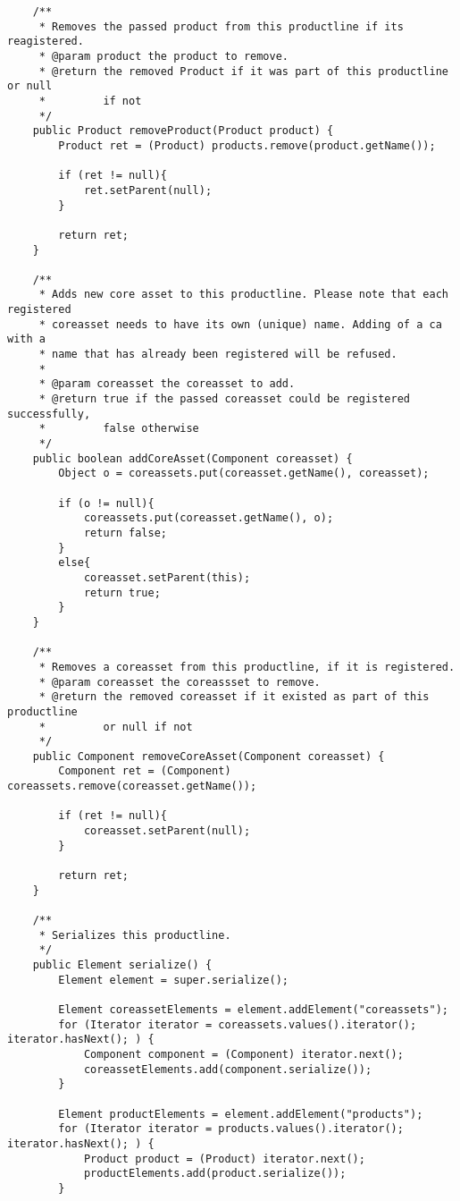 \begin{verbatim}
	/**
	 * Removes the passed product from this productline if its reagistered.
	 * @param product the product to remove.
     * @return the removed Product if it was part of this productline or null 
     *         if not
	 */
	public Product removeProduct(Product product) {
		Product ret = (Product) products.remove(product.getName());
        
        if (ret != null){
        	ret.setParent(null);
        }
        
        return ret;
	}

	/**
	 * Adds new core asset to this productline. Please note that each registered
     * coreasset needs to have its own (unique) name. Adding of a ca with a
     * name that has already been registered will be refused. 
     * 
	 * @param coreasset the coreasset to add.
     * @return true if the passed coreasset could be registered successfully,
     *         false otherwise
	 */
	public boolean addCoreAsset(Component coreasset) {
        Object o = coreassets.put(coreasset.getName(), coreasset);
        
        if (o != null){
            coreassets.put(coreasset.getName(), o);
            return false;
        }
        else{
        	coreasset.setParent(this);
            return true;
        }
	}
	
	/**
	 * Removes a coreasset from this productline, if it is registered.
	 * @param coreasset the coreassset to remove.
     * @return the removed coreasset if it existed as part of this productline 
     *         or null if not
	 */
	public Component removeCoreAsset(Component coreasset) {
		Component ret = (Component) coreassets.remove(coreasset.getName());
        
        if (ret != null){
        	coreasset.setParent(null);
        }
        
        return ret;
	}

	/**
	 * Serializes this productline.
	 */
	public Element serialize() {
		Element element = super.serialize();

		Element coreassetElements = element.addElement("coreassets");
		for (Iterator iterator = coreassets.values().iterator(); iterator.hasNext(); ) {
			Component component = (Component) iterator.next();
			coreassetElements.add(component.serialize());
		}
		
		Element productElements = element.addElement("products");
		for (Iterator iterator = products.values().iterator(); iterator.hasNext(); ) {
			Product product = (Product) iterator.next();
			productElements.add(product.serialize());
		}


\end{verbatim}
